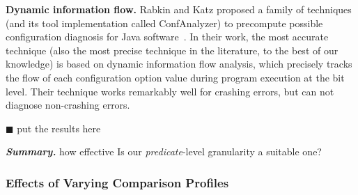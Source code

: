 \vspace{1mm}
\noindent \textbf{Dynamic information flow.}
Rabkin and Katz proposed a family of techniques (and its tool implementation called ConfAnalyzer)
to precompute possible
configuration diagnosis for Java software~\cite{Rabkin:2011:PPC}. In their work,
the most accurate technique (also the most precise technique in the literature,
to the best of our knowledge) is based on dynamic information flow analysis, which precisely
tracks the flow of each configuration option value during program execution at the bit level.
Their technique works remarkably well for crashing errors, but can
not diagnose non-crashing errors.

\vspace{1mm}
$\blacksquare$ put the results here

\vspace{1mm}
\noindent \textbf{\textit{Summary.}} how effective
Is our \textit{predicate}-level granularity a suitable one?

\subsubsection{Effects of Varying Comparison Profiles}
\label{sec:ranking}


